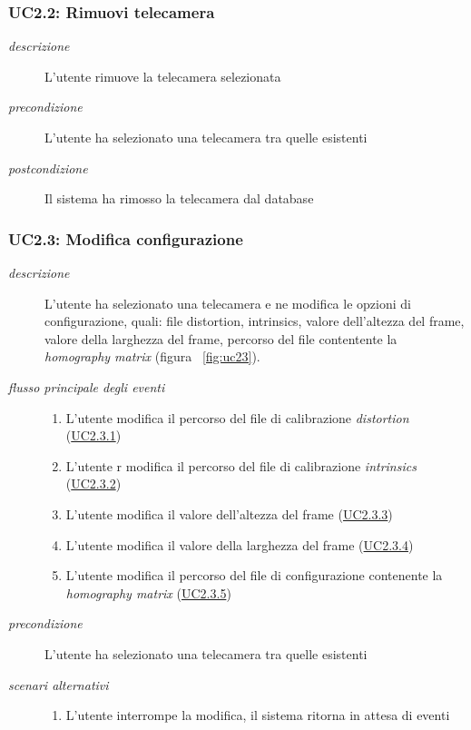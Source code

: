 \subsubsection{UC2.2: Rimuovi telecamera} \label{sec:UC2.2}
\begin{description}
\item[\em{descrizione }]L'utente rimuove la telecamera selezionata
\item[\em{precondizione }] L'utente ha selezionato una telecamera tra quelle esistenti
\item[\em{postcondizione }] Il sistema ha rimosso la telecamera dal database
\end{description}

\subsubsection{UC2.3: Modifica configurazione} \label{sec:UC2.3}
\begin{description}
\item[\em{descrizione }]L'utente ha selezionato una telecamera e ne modifica le opzioni di configurazione, quali: file distortion, intrinsics, valore dell'altezza del frame, valore della larghezza del frame, percorso del file contentente la \textit{homography matrix} (figura ~\ref{fig:uc23}).
\item[\em{flusso principale degli eventi }] \mbox{}
 \begin{enumerate}
\item L'utente modifica il percorso del file di calibrazione \textit{distortion} (\hyperref[sec:uc2.3.1]{UC2.3.1})
\item L'utente r modifica il percorso del file di calibrazione \textit{intrinsics} (\hyperref[sec:uc2.3.2]{UC2.3.2})
\item L'utente modifica il valore dell'altezza del frame (\hyperref[sec:uc2.3.3]{UC2.3.3})
\item L'utente modifica il valore della larghezza del frame (\hyperref[sec:uc2.3.4]{UC2.3.4})
\item L'utente modifica il percorso del file di configurazione contenente la \textit{homography matrix} (\hyperref[sec:uc2.3.5]{UC2.3.5})
\end{enumerate}
\item[\em{precondizione }] L'utente ha selezionato una telecamera tra quelle esistenti
\item[\em{scenari alternativi }] \mbox{}

  \begin{enumerate}
\item L'utente interrompe la modifica, il sistema ritorna in attesa di eventi
\end{enumerate}
\end{description}

